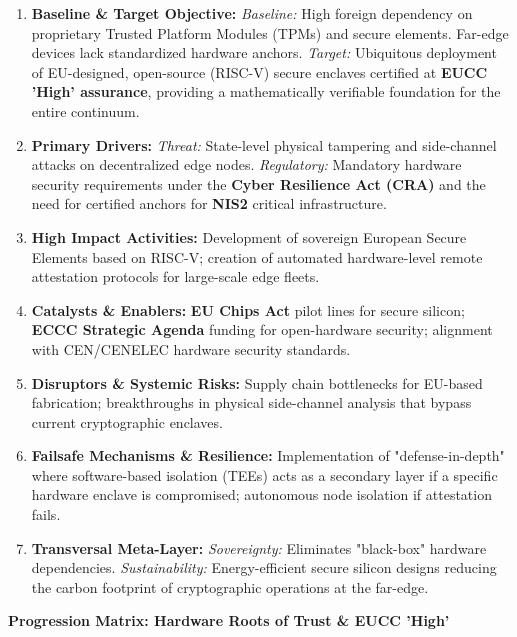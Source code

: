 \documentclass[12pt,a4paper]{article}
\begin{document}
\begin{enumerate}
\item \textbf{Baseline \& Target Objective:}
\textit{Baseline:} High foreign dependency on proprietary Trusted Platform Modules (TPMs) and secure elements. Far-edge devices lack standardized hardware anchors.
\textit{Target:} Ubiquitous deployment of EU-designed, open-source (RISC-V) secure enclaves certified at \textbf{EUCC 'High' assurance}, providing a mathematically verifiable foundation for the entire continuum.

\item \textbf{Primary Drivers:} 
\textit{Threat:} State-level physical tampering and side-channel attacks on decentralized edge nodes. 
\textit{Regulatory:} Mandatory hardware security requirements under the \textbf{Cyber Resilience Act (CRA)} and the need for certified anchors for \textbf{NIS2} critical infrastructure.

\item \textbf{High Impact Activities:} 
Development of sovereign European Secure Elements based on RISC-V; creation of automated hardware-level remote attestation protocols for large-scale edge fleets.

\item \textbf{Catalysts \& Enablers:} 
\textbf{EU Chips Act} pilot lines for secure silicon; \textbf{ECCC Strategic Agenda} funding for open-hardware security; alignment with CEN/CENELEC hardware security standards.

\item \textbf{Disruptors \& Systemic Risks:} 
Supply chain bottlenecks for EU-based fabrication; breakthroughs in physical side-channel analysis that bypass current cryptographic enclaves.

\item \textbf{Failsafe Mechanisms \& Resilience:} 
Implementation of "defense-in-depth" where software-based isolation (TEEs) acts as a secondary layer if a specific hardware enclave is compromised; autonomous node isolation if attestation fails.

\item \textbf{Transversal Meta-Layer:} 
\textit{Sovereignty:} Eliminates "black-box" hardware dependencies. \textit{Sustainability:} Energy-efficient secure silicon designs reducing the carbon footprint of cryptographic operations at the far-edge.

\end{enumerate}

\vspace{0.5cm}
\noindent\textbf{Progression Matrix: Hardware Roots of Trust \& EUCC 'High'}
\vspace{0.2cm}
\end{document}

